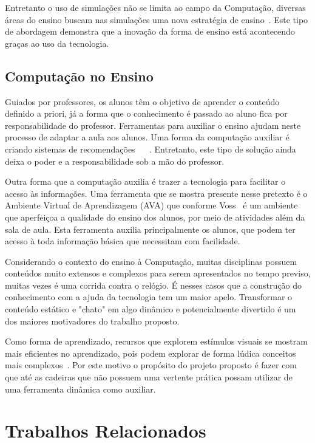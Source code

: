 \documentclass[tcc,capa]{texufpel}
\begin{document}
Entretanto o uso de simulações não se limita ao campo da Computação, diversas áreas do ensino buscam nas simulações uma nova estratégia de ensino~\cite{barreto2014simulaccao}. Este tipo de abordagem demonstra que a inovação da forma de ensino está acontecendo graças ao uso da tecnologia.

\section{Computação no Ensino}

Guiados por professores, os alunos têm o objetivo de aprender o conteúdo definido a priori, já a forma que o conhecimento é passado ao aluno fica por responsabilidade do professor. Ferramentas para auxiliar o ensino ajudam neste processo de adaptar a aula aos alunos. Uma forma da computação auxiliar é criando sistemas de recomendações ~\cite{drachsler2015panorama} ~\cite{aguiar2018recomendacao}. Entretanto, este tipo de solução ainda deixa o poder e a responsabilidade sob a mão do professor.

Outra forma que a computação auxilia é trazer a tecnologia para facilitar o acesso às informações. Uma ferramenta que se mostra presente nesse pretexto é o Ambiente Virtual de Aprendizagem (AVA) que conforme Voss~\cite{Voss_Nunes_Herpich_Medina_2015} é um ambiente que aperfeiçoa a qualidade do ensino dos alunos, por meio de atividades além da sala de aula. Esta ferramenta auxilia principalmente os alunos, que podem ter acesso à toda informação básica que necessitam com facilidade.

Considerando o contexto do ensino à Computação, muitas disciplinas possuem conteúdos muito extensos e complexos para serem apresentados no tempo previso, muitas vezes é uma corrida contra o relógio. É nesses casos que a construção do conhecimento com a ajuda da tecnologia tem um maior apelo. Transformar o conteúdo estático e "chato" em algo dinâmico e potencialmente divertido é um dos maiores motivadores do trabalho proposto.

Como forma de aprendizado, recursos que explorem estímulos visuais se mostram mais eficientes no aprendizado, pois podem explorar de forma lúdica conceitos mais complexos~\cite{klawe1999computer}. Por este motivo o propósito do projeto proposto é fazer com que até as cadeiras que não possuem uma vertente prática possam utilizar de uma ferramenta dinâmica como auxiliar.

\chapter{Trabalhos Relacionados}
\label{cap: trabalhos_relacionados}
\end{document}
